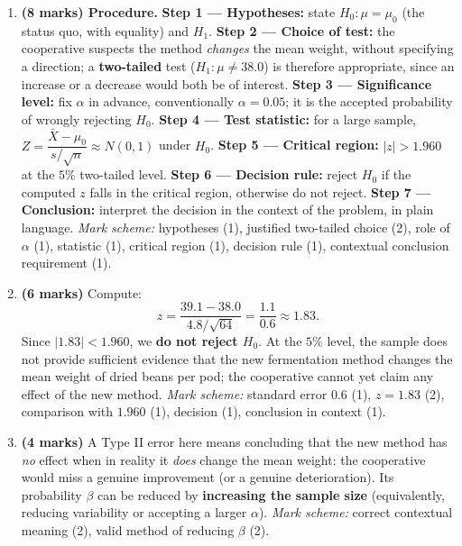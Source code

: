 \documentclass[11pt]{article}
\begin{document}
\begin{corrige}
\begin{enumerate}
\item \textbf{(8 marks) Procedure.} \textbf{Step 1 --- Hypotheses:} state $H_0:\mu=\mu_0$ (the status quo, with equality) and $H_1$. \textbf{Step 2 --- Choice of test:} the cooperative suspects the method \emph{changes} the mean weight, without specifying a direction; a \textbf{two-tailed} test ($H_1:\mu\neq 38.0$) is therefore appropriate, since an increase or a decrease would both be of interest. \textbf{Step 3 --- Significance level:} fix $\alpha$ in advance, conventionally $\alpha=0.05$; it is the accepted probability of wrongly rejecting $H_0$. \textbf{Step 4 --- Test statistic:} for a large sample, $Z=\dfrac{\bar{X}-\mu_0}{s/\sqrt{n}}\approx N(0,1)$ under $H_0$. \textbf{Step 5 --- Critical region:} $|z|>1.960$ at the $5\%$ two-tailed level. \textbf{Step 6 --- Decision rule:} reject $H_0$ if the computed $z$ falls in the critical region, otherwise do not reject. \textbf{Step 7 --- Conclusion:} interpret the decision in the context of the problem, in plain language. \emph{Mark scheme:} hypotheses (1), justified two-tailed choice (2), role of $\alpha$ (1), statistic (1), critical region (1), decision rule (1), contextual conclusion requirement (1).
\item \textbf{(6 marks)} Compute:
\[ z=\frac{39.1-38.0}{4.8/\sqrt{64}}=\frac{1.1}{0.6}\approx 1.83. \]
Since $|1.83|<1.960$, we \textbf{do not reject $H_0$}. At the $5\%$ level, the sample does not provide sufficient evidence that the new fermentation method changes the mean weight of dried beans per pod; the cooperative cannot yet claim any effect of the new method. \emph{Mark scheme:} standard error $0.6$ (1), $z=1.83$ (2), comparison with $1.960$ (1), decision (1), conclusion in context (1).
\item \textbf{(4 marks)} A Type II error here means concluding that the new method has \emph{no} effect when in reality it \emph{does} change the mean weight: the cooperative would miss a genuine improvement (or a genuine deterioration). Its probability $\beta$ can be reduced by \textbf{increasing the sample size} (equivalently, reducing variability or accepting a larger $\alpha$). \emph{Mark scheme:} correct contextual meaning (2), valid method of reducing $\beta$ (2).
\end{enumerate}
\end{corrige}

\newpage
\end{document}
